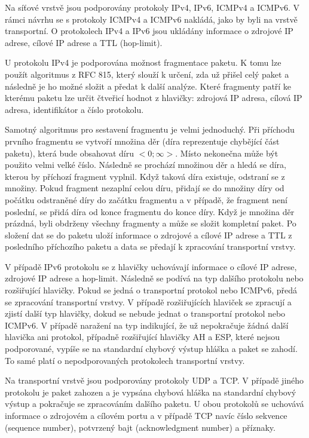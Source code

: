\documentclass[11pt, a4paper]{article}
\begin{document}
Na síťové vrstvě jsou podporovány protokoly IPv4, IPv6, ICMPv4 a ICMPv6. 
V rámci návrhu se s protokoly ICMPv4 a ICMPv6 nakládá, jako by byli na vrstvě transportní. 
O protokolech IPv4 a IPv6 jsou ukládány informace o zdrojové IP adrese, cílové IP adrese a TTL (hop-limit).

U protokolu IPv4 je podporována možnost fragmentace paketu. 
K tomu lze použít algoritmus z RFC 815, který slouží k určení, zda už přišel celý paket a následně je ho možné složit a předat k další analýze. \cite{rfc:815}
Které fragmenty patří ke kterému paketu lze určit čtveřicí hodnot z hlavičky: zdrojová IP adresa, cílová IP adresa, identifikátor a číslo protokolu. 

Samotný algoritmus pro sestavení fragmentu je velmi jednoduchý. 
Při příchodu prvního fragmentu se vytvoří množina děr (díra reprezentuje chybějící část paketu), která bude obsahovat díru $<0; \infty>$. 
Místo nekonečna může být použito velmi velké číslo.
Následně se prochází množinou děr a hledá se díra, kterou by příchozí fragment vyplnil. 
Když taková díra existuje, odstraní se z množiny. 
Pokud fragment nezaplní celou díru, přidají se do množiny díry od počátku odstraněné díry do začátku fragmentu a v případě, že fragment není poslední, se přidá díra od konce fragmentu do konce díry. 
Když je množina děr prázdná, byli obdrženy všechny fragmenty a může se složit kompletní paket.
Po složení dat se do paketu uloží informace o zdrojové a cílové IP adrese a TTL z posledního příchozího paketu a data se předají k zpracování transportní vrstvy.

V případě IPv6 protokolu se z hlavičky uchovávají informace o cílové IP adrese, zdrojové IP adrese a hop-limit. 
Následně se podívá na typ dalšího protokolu nebo rozšiřující hlavičky. 
Pokud se jedná o transportní protokol nebo ICMPv6, předá se zpracování transportní vrstvy. 
V případě rozšiřujících hlaviček se zpracují a zjistí další typ hlavičky, dokud se nebude jednat o transportní protokol nebo ICMPv6. 
V případě naražení na typ indikující, že už nepokračuje žádná další hlavička ani protokol, případně rozšiřující hlavičky AH a ESP, které nejsou podporované, vypíše se na standardní chybový výstup hláška a paket se zahodí. 
To samé platí o nepodporovaných protokolech transportní vrstvy.

Na transportní vrstvě jsou podporovány protokoly UDP a TCP. 
V případě jiného protokolu je paket zahozen a je vypsána chybová hláška na standardní chybový výstup a pokračuje se zpracováním dalšího paketu. 
U obou protokolů se uchovává informace o zdrojovém a cílovém portu a v případě TCP navíc číslo sekvence (sequence number), potvrzený bajt (acknowledgment number) a příznaky.
\end{document}
